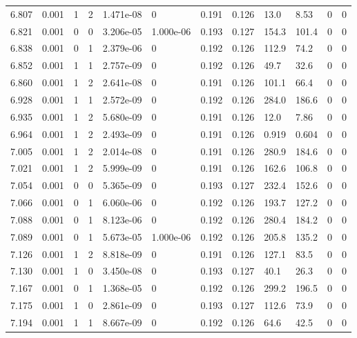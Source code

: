 \documentclass[preview]{standalone}
\begin{document}
{{{{{\begin{tabular}{L{1.2cm}C{1.2cm} C{0.3cm}C{0.5cm} C{1.4cm}C{1.4cm} C{1.4cm}C{1.4cm} C{1.6cm}C{1.6cm} C{1.6cm}C{1.6cm}}
  6.807  &  0.001  & 1     &  2 &  1.471e-08  & 0  &  0.191&   0.126& 13.0 & 8.53   &  0 & 0  \\ 
  6.821  &  0.001  & 0     &  0 &  3.206e-05  & 1.000e-06  &  0.193&   0.127& 154.3 & 101.4   &  0 & 0  \\ 
  6.838  &  0.001  & 0     &  1 &  2.379e-06  & 0  &  0.192&   0.126& 112.9 & 74.2   &  0 & 0  \\ 
  6.852  &  0.001  & 1     &  1 &  2.757e-09  & 0  &  0.192&   0.126& 49.7 & 32.6   &  0 & 0  \\ 
  6.860  &  0.001  & 1     &  2 &  2.641e-08  & 0  &  0.191&   0.126& 101.1 & 66.4   &  0 & 0  \\ 
  6.928  &  0.001  & 1     &  1 &  2.572e-09  & 0  &  0.192&   0.126& 284.0 & 186.6   &  0 & 0  \\ 
  6.935  &  0.001  & 1     &  2 &  5.680e-09  & 0  &  0.191&   0.126& 12.0 & 7.86   &  0 & 0  \\ 
  6.964  &  0.001  & 1     &  2 &  2.493e-09  & 0  &  0.191&   0.126& 0.919 & 0.604   &  0 & 0  \\ 
  7.005  &  0.001  & 1     &  2 &  2.014e-08  & 0  &  0.191&   0.126& 280.9 & 184.6   &  0 & 0  \\ 
  7.021  &  0.001  & 1     &  2 &  5.999e-09  & 0  &  0.191&   0.126& 162.6 & 106.8   &  0 & 0  \\ 
  7.054  &  0.001  & 0     &  0 &  5.365e-09  & 0  &  0.193&   0.127& 232.4 & 152.6   &  0 & 0  \\ 
  7.066  &  0.001  & 0     &  1 &  6.060e-06  & 0  &  0.192&   0.126& 193.7 & 127.2   &  0 & 0  \\ 
  7.088  &  0.001  & 0     &  1 &  8.123e-06  & 0  &  0.192&   0.126& 280.4 & 184.2   &  0 & 0  \\ 
  7.089  &  0.001  & 0     &  1 &  5.673e-05  & 1.000e-06  &  0.192&   0.126& 205.8 & 135.2   &  0 & 0  \\ 
  7.126  &  0.001  & 1     &  2 &  8.818e-09  & 0  &  0.191&   0.126& 127.1 & 83.5   &  0 & 0  \\ 
  7.130  &  0.001  & 1     &  0 &  3.450e-08  & 0  &  0.193&   0.127& 40.1 & 26.3   &  0 & 0  \\ 
  7.167  &  0.001  & 0     &  1 &  1.368e-05  & 0  &  0.192&   0.126& 299.2 & 196.5   &  0 & 0  \\ 
  7.175  &  0.001  & 1     &  0 &  2.861e-09  & 0  &  0.193&   0.127& 112.6 & 73.9   &  0 & 0  \\ 
  7.194  &  0.001  & 1     &  1 &  8.667e-09  & 0  &  0.192&   0.126& 64.6 & 42.5   &  0 & 0  \\ 

\end{tabular}}}}}}
\end{document}

